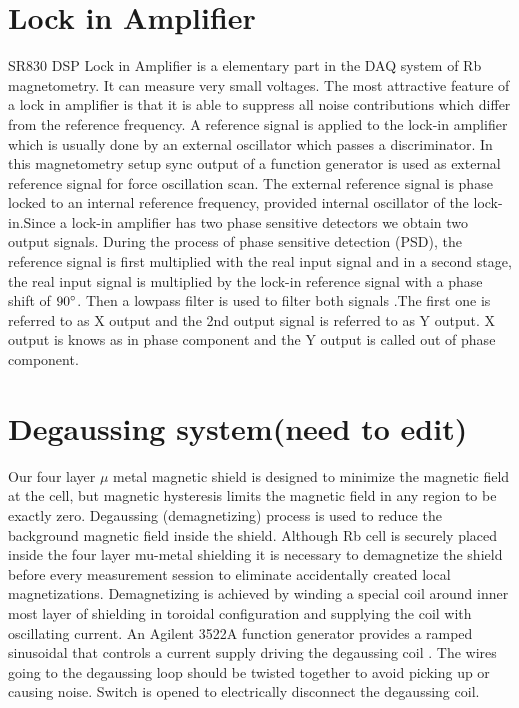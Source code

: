 \section{Lock in Amplifier}
SR830 DSP Lock in Amplifier is a elementary part in the DAQ system of Rb magnetometry. It can measure very  small voltages. The most attractive feature of a lock in amplifier is that it is able to suppress all noise contributions which differ from the reference frequency. A reference signal is applied to the lock-in amplifier which is usually done by an external oscillator which passes a discriminator. In this magnetometry setup sync output of a function generator is used as external reference signal for force oscillation scan. The external reference signal is phase locked to an internal reference frequency, provided internal oscillator of the lock-in.Since a lock-in amplifier has two phase sensitive detectors we obtain two output signals. During the process of phase sensitive detection (PSD), the reference signal is first multiplied with the real input signal  and in a second stage, the real input signal is multiplied by
the lock-in reference signal with a phase shift of $90\degree$. Then a lowpass filter is used to filter both signals .The first one is referred to as X output and the 2nd output signal is referred to as Y output. X output is knows as in phase component and the Y output is called out of phase component.
\section{Degaussing system(need to edit)}
Our four layer $\mu$ metal magnetic shield is designed to minimize the magnetic field at the cell, but
magnetic hysteresis limits the magnetic field in any region to be exactly zero. Degaussing (demagnetizing) process is used to reduce the background magnetic field inside the shield. Although Rb cell is securely placed inside the four layer mu-metal shielding it is necessary to demagnetize the shield before every measurement session  to eliminate accidentally created local magnetizations.
Demagnetizing is achieved by winding a special coil around inner most layer of shielding  in toroidal configuration
and supplying the coil with oscillating current. An Agilent 3522A function generator  provides a ramped sinusoidal that controls a current supply driving the degaussing coil \cite{Martin:2014foa}. The wires going to the degaussing loop should be twisted together to avoid picking up or causing noise. Switch is opened to electrically disconnect the degaussing coil.
 
